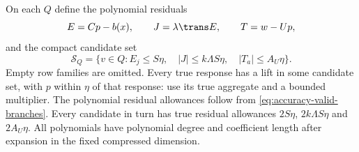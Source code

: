 On each $Q$ define the polynomial residuals
\[
 E=Cp-b(x),\qquad J=\lambda\trans E,\qquad T=w-Up,
\]
and the compact candidate set
\begin{equation}\label{eq:accuracy-candidate}
 \mathcal S_Q=\{v\in Q:E_j\le S\eta,\quad
        |J|\le k\Lambda S\eta,\quad |T_a|\le A_U\eta\}.
\end{equation}
Empty row families are omitted. Every true response has a lift in some
candidate set, with $p$ within $\eta$ of that response: use its true
aggregate and a bounded multiplier. The polynomial residual allowances
follow from \eqref{eq:accuracy-valid-branches}. Every candidate in turn
has true residual allowances $2S\eta$, $2k\Lambda S\eta$ and
$2A_U\eta$. All polynomials have polynomial degree and coefficient
length after expansion in the fixed compressed dimension.

